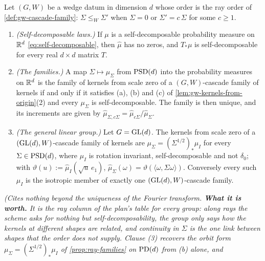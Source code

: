 \begin{proposition}
\label{prop:gw-ray-families}
\leanok
Let $(G, W)$ be a wedge datum in dimension $d$ whose order is the ray order of
\ref{def:gw-cascade-family}: $\Sigma \le_W \Sigma'$ when $\Sigma = 0$ or $\Sigma' = c\,\Sigma$ for some
$c \ge 1$.
\begin{enumerate}
\item \emph{(Self-decomposable laws.)} If $\mu$ is a self-decomposable probability measure on $\mathbb{R}^d$
\ref{eq:self-decomposable}, then $\widehat\mu$ has no zeros, and $T_*\mu$ is self-decomposable for
every real $d \times d$ matrix $T$.
\item \emph{(The families.)} A map $\Sigma \mapsto \mu_\Sigma$ from $\mathrm{PSD}(d)$ into the probability
measures on $\mathbb{R}^d$ is the family of kernels from scale zero of a $(G, W)$-cascade family of kernels if
and only if it satisfies (a), (b) and (c) of \ref{lem:gw-kernels-from-origin}(2) and every $\mu_\Sigma$
is self-decomposable. The family is then unique, and its increments are given by
$\widehat\mu_{\Sigma,c\Sigma} = \widehat\mu_{c\Sigma}/\widehat\mu_\Sigma$.
\item \emph{(The general linear group.)} Let $G = \mathrm{GL}(d)$. The kernels from scale zero of a
$(\mathrm{GL}(d), W)$-cascade family of kernels are $\mu_\Sigma = (\Sigma^{1/2})_*\mu_I$ for every
$\Sigma \in \mathrm{PSD}(d)$, where $\mu_I$ is rotation invariant, self-decomposable and not $\delta_0$; with
$\vartheta(u) := \widehat\mu_I(\sqrt u\,e_1)$, $\widehat\mu_\Sigma(\omega) = \vartheta(\langle\omega,\Sigma\omega\rangle)$.
Conversely every such $\mu_I$ is the isotropic member of exactly one $(\mathrm{GL}(d), W)$-cascade family.
\end{enumerate}
\statusT\quad\emph{(Cites nothing beyond the uniqueness of the Fourier transform. \textbf{What it is
worth.} It is the ray column of the plan's table for every group: along rays the scheme asks for nothing
but self-decomposability, the group only says how the kernels at different shapes are related, and
continuity in $\Sigma$ is the one link between shapes that the order does not supply. Clause (3)
recovers the orbit form $\mu_\Sigma = (\Sigma^{1/2})_*\mu_I$ of \ref{prop:ray-families} on $\mathrm{PD}(d)$ from (b) alone, and
}
\end{proposition}
